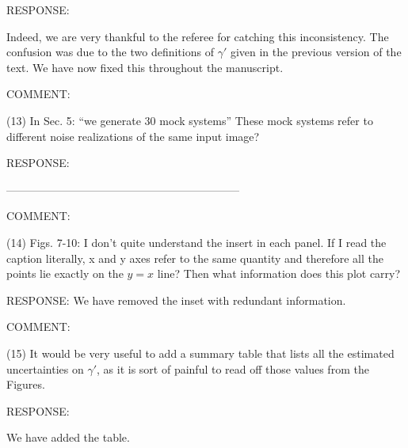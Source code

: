 \documentclass[a4paper,11pt]{article}
\begin{document}
RESPONSE: 

Indeed, we are very thankful to the referee for catching this
inconsistency. The confusion was due to the two definitions of
$\gamma'$ given in the previous version of the text. We have now fixed
this throughout the manuscript.

COMMENT:

(13) In Sec. 5: ``we generate 30 mock systems'' These mock systems refer to different noise realizations of the same input image?


RESPONSE:


---------------------------------------------------------------

COMMENT:

(14) Figs. 7-10: I don't quite understand the insert in each panel. If
I read the caption literally, x and y axes refer to the same quantity
and therefore all the points lie exactly on the $y = x$ line? Then
what information does this plot carry?

RESPONSE:
We have removed the inset with redundant information.

COMMENT:

(15) It would be very useful to add a summary table that lists all the
estimated uncertainties on $\gamma'$, as it is sort of painful to read
off those values from the Figures.


RESPONSE:

We have added the table.
\end{document}
